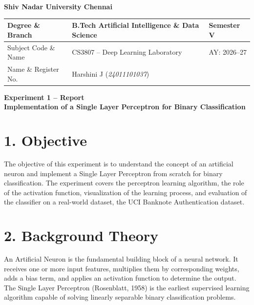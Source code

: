 \documentclass[11pt]{article}
\begin{document}
\begin{center}
\Large\textbf{Shiv Nadar University Chennai}\\[2mm]
\end{center}
\renewcommand{\arraystretch}{1.4}
\begin{tabular}{|p{3.5cm}|p{8cm}|p{2cm}|}
\hline
Degree \& Branch & B.Tech Artificial Intelligence \& Data Science & Semester V\\ \hline
Subject Code \& Name & CS3807 -- Deep Learning Laboratory & AY: 2026--27\\ \hline
Name \& Register No. & Harshini J \hfill (\textit{24011101037}) & \\ \hline
\end{tabular}
\vspace{3mm}


\begin{center}
\Large\textbf{Experiment 1 -- Report}\\
\large\textbf{Implementation of a Single Layer Perceptron for Binary Classification}
\end{center}

\section*{1. Objective}
The objective of this experiment is to understand the concept of an artificial neuron and implement a Single Layer Perceptron from scratch for binary classification. The experiment covers the perceptron learning algorithm, the role of the activation function, visualization of the learning process, and evaluation of the classifier on a real-world dataset, the UCI Banknote Authentication dataset.
\section*{2. Background Theory}
An Artificial Neuron is the fundamental building block of a neural network. It receives one or more input features, multiplies them by corresponding weights, adds a bias term, and applies an activation function to determine the output. The Single Layer Perceptron (Rosenblatt, 1958) is the earliest supervised learning algorithm capable of solving linearly separable binary classification problems.
\end{document}
